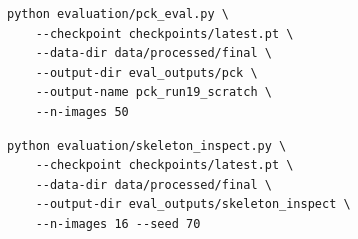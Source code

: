 \documentclass[12pt,a4paper]{article}
\begin{document}
\begin{lstlisting}[style=python, caption={Évaluation PCK}]
python evaluation/pck_eval.py \
    --checkpoint checkpoints/latest.pt \
    --data-dir data/processed/final \
    --output-dir eval_outputs/pck \
    --output-name pck_run19_scratch \
    --n-images 50
\end{lstlisting}

\begin{lstlisting}[style=python, caption={Inspection visuelle des squelettes}]
python evaluation/skeleton_inspect.py \
    --checkpoint checkpoints/latest.pt \
    --data-dir data/processed/final \
    --output-dir eval_outputs/skeleton_inspect \
    --n-images 16 --seed 70
\end{lstlisting}
\end{document}
